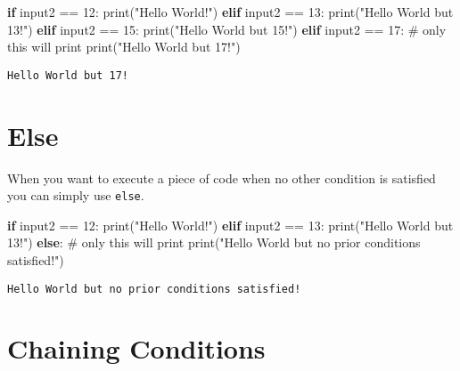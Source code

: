 \documentclass[
  letterpaper,
  DIV=11,
  numbers=noendperiod]{scrreprt}
\newenvironment{Shaded}{\begin{snugshade}}{\end{snugshade}}
\newcommand{\BuiltInTok}[1]{\textcolor[rgb]{0.00,0.23,0.31}{#1}}
\newcommand{\CommentTok}[1]{\textcolor[rgb]{0.37,0.37,0.37}{#1}}
\newcommand{\ControlFlowTok}[1]{\textcolor[rgb]{0.00,0.23,0.31}{\textbf{#1}}}
\newcommand{\DecValTok}[1]{\textcolor[rgb]{0.68,0.00,0.00}{#1}}
\newcommand{\NormalTok}[1]{\textcolor[rgb]{0.00,0.23,0.31}{#1}}
\newcommand{\OperatorTok}[1]{\textcolor[rgb]{0.37,0.37,0.37}{#1}}
\newcommand{\StringTok}[1]{\textcolor[rgb]{0.13,0.47,0.30}{#1}}
\begin{document}
\begin{Shaded}
\begin{Highlighting}[]
\ControlFlowTok{if}\NormalTok{ input2 }\OperatorTok{==} \DecValTok{12}\NormalTok{:}
    \BuiltInTok{print}\NormalTok{(}\StringTok{"Hello World!"}\NormalTok{)}
\ControlFlowTok{elif}\NormalTok{ input2 }\OperatorTok{==} \DecValTok{13}\NormalTok{:}
    \BuiltInTok{print}\NormalTok{(}\StringTok{"Hello World but 13!"}\NormalTok{)}
\ControlFlowTok{elif}\NormalTok{ input2 }\OperatorTok{==} \DecValTok{15}\NormalTok{:}
    \BuiltInTok{print}\NormalTok{(}\StringTok{"Hello World but 15!"}\NormalTok{)}
\ControlFlowTok{elif}\NormalTok{ input2 }\OperatorTok{==} \DecValTok{17}\NormalTok{: }\CommentTok{\# only this will print}
    \BuiltInTok{print}\NormalTok{(}\StringTok{"Hello World but 17!"}\NormalTok{)}
\end{Highlighting}
\end{Shaded}

\begin{verbatim}
Hello World but 17!
\end{verbatim}

\section{Else}\label{else}

When you want to execute a piece of code when no other condition is
satisfied you can simply use \texttt{else}.

\begin{Shaded}
\begin{Highlighting}[]
\ControlFlowTok{if}\NormalTok{ input2 }\OperatorTok{==} \DecValTok{12}\NormalTok{: }
    \BuiltInTok{print}\NormalTok{(}\StringTok{"Hello World!"}\NormalTok{)}
\ControlFlowTok{elif}\NormalTok{ input2 }\OperatorTok{==} \DecValTok{13}\NormalTok{:}
    \BuiltInTok{print}\NormalTok{(}\StringTok{"Hello World but 13!"}\NormalTok{)}
\ControlFlowTok{else}\NormalTok{: }\CommentTok{\# only this will print}
    \BuiltInTok{print}\NormalTok{(}\StringTok{"Hello World but no prior conditions satisfied!"}\NormalTok{)}
\end{Highlighting}
\end{Shaded}

\begin{verbatim}
Hello World but no prior conditions satisfied!
\end{verbatim}

\section{Chaining Conditions}\label{chaining-conditions}
\end{document}

